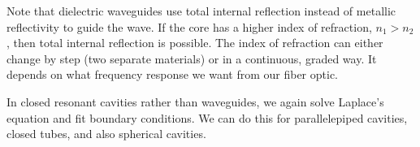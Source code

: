 Note that dielectric waveguides use total internal reflection instead of metallic reflectivity to guide the wave. If the core has a higher index of refraction, $n_1 > n_2$, then total internal reflection is possible. The index of refraction can either change by step (two separate materials) or in a continuous, graded way. It depends on what frequency response we want from our fiber optic.

In closed resonant cavities rather than waveguides, we again solve Laplace's equation and fit boundary conditions. We can do this for parallelepiped cavities, closed tubes, and also spherical cavities.